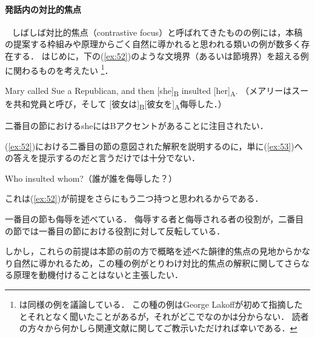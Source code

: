 \documentclass{goken}
\newcommand{\term}[2]{\textsf{#1}（#2）}
\begin{document}
\paragraph{発話内の対比的焦点}\label{sec:2.2.2.2}
\ \newline\indent
しばしば\term{対比的焦点}{contrastive focus}と呼ばれてきたものの例には，本稿の提案する枠組みや原理からごく自然に導かれると思われる類いの例が数多く存在する．
はじめに，下の(\ref{ex:52})のような文境界（あるいは節境界）を超える例に関わるものを考えたい
\footnote{%
  \citet{Rooth1992b}は同様の例を議論している．
  この種の例はGeorge Lakoffが初めて指摘したとそれとなく聞いたことがあるが，それがどこでなのかは分からない．
  読者の方々から何かしら関連文献に関してご教示いただければ幸いである．
}．

\setcounter{exx}{51}
\begin{exe}
	\ex\label{ex:52} Mary called Sue a Republican, and then [she]\textsubscript{B} insulted [her]\textsubscript{A}. （メアリーはスーを共和党員と呼び，そして [彼女は]\textsubscript{B}[彼女を]\textsubscript{A}侮辱した．）
\end{exe}

\noindent
二番目の節におけるsheにはBアクセントがあることに注目されたい．

(\ref{ex:52})における二番目の節の意図された解釈を説明するのに，単に(\ref{ex:53})への答えを提示するのだと言うだけでは十分でない．

\begin{exe}
	\ex\label{ex:53} Who insulted whom?（誰が誰を侮辱した？）
\end{exe}

\noindent
これは(\ref{ex:52})が前提をさらにもう二つ持つと思われるからである．

\begin{exe}
	\ex\label{ex:54}
  \begin{xlist}
    \ex\label{ex:54a}
    一番目の節も侮辱を述べている．
    \ex\label{ex:54b}
    侮辱する者と侮辱される者の役割が，二番目の節では一番目の節における役割に対して反転している．
  \end{xlist}
\end{exe}

\noindent
しかし，これらの前提は本節の前の方で概略を述べた韻律的焦点の見地からかなり自然に導かれるため，この種の例がとりわけ対比的焦点の解釈に関してさらなる原理を動機付けることはないと主張したい．
\end{document}
